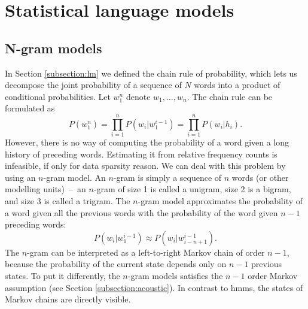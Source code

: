 \chapter{Statistical language models}
\label{chapter:lm}

\section{N-gram models}
\label{section:ngrams}
In Section \ref{subsection:lm} we defined the chain rule of probability, which lets us decompose the joint probability of a sequence of $N$ words into a product of conditional probabilities. Let $w_{1}^{n}$ denote $w_{1}, \dots, w_{n}$. The chain rule can be formulated as
\begin{equation}
	\label{equation:chain}
	P(w_{1}^{n})=\prod_{i=1}^{n}P(w_{i}|w_{1}^{i-1})=\prod_{i=1}^{n}P(w_{i}|h_{i}).
\end{equation}
However, there is no way of computing the probability of a word given a long history of preceding words. Estimating it from relative frequency counts is infeasible, if only for data sparsity reason. We can deal with this problem by using an \mbox{$n$-gram} model. An \mbox{$n$-gram} is simply a sequence of $n$ words (or other modelling units)~--~an \mbox{$n$-gram} of size 1 is called a unigram, size 2 is a bigram, and size 3 is called a trigram. The \mbox{$n$-gram} model approximates the probability of a word given all the previous words with the probability of the word given $n-1$ preceding words:
\begin{equation}
	P(w_{i}|w_{1}^{i-1})\approx P(w_{i}|w_{i-n+1}^{i-1}).
\end{equation}
The \mbox{$n$-gram} can be interpreted as a left-to-right Markov chain of order $n-1$, because the probability of the current state depends only on $n-1$ previous states. To put it differently, the \mbox{$n$-gram} models satisfies the $n-1$ order Markov assumption (see Section \ref{subsection:acoustic}). In contrast to \glspl{hmm}, the states of Markov chains are directly visible.

